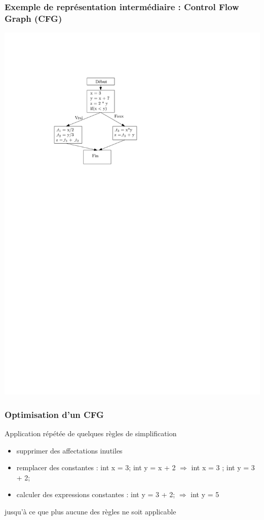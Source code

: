 \documentclass{beamer}
\begin{document}
\begin{frame}
\frametitle{Exemple de représentation intermédiaire : Control Flow Graph (CFG)}

\centering\includegraphics[width=0.7\columnwidth]{Figs/three_adresses.pdf}

\end{frame}

\begin{frame}
\frametitle{Optimisation d'un CFG}

\begin{block}{}
Application répétée de quelques règles de simplification
\begin{itemize}
\item supprimer des affectations inutiles
\item remplacer des constantes : int x = 3; int y = x + 2 $\Rightarrow$ int x = 3 ; int y = 3 + 2;
\item calculer des expressions constantes : int y = 3 + 2; $\Rightarrow$ int y = 5
\end{itemize}
jusqu'à ce que plus aucune des règles ne soit applicable
\end{block}
\end{frame}
\end{document}
